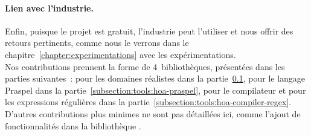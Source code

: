 \paragraph{Lien avec l'industrie.} Enfin, puisque le projet est gratuit,
l'industrie peut l'utiliser et nous offrir des retours pertinents, comme nous le
verrons dans le chapitre~\ref{chapter:experimentations} avec les
expérimentations. \\

Nos contributions prennent la forme de 4~bibliothèques, présentées dans les
parties suivantes~:  pour les domaines réalistes
dans la partie~\ref{subsection:tools:hoa-realdom}, 
pour le langage Praspel dans la partie~\ref{subsection:tools:hoa-praspel},
 pour le compilateur et
 pour les expressions régulières dans la
partie~\ref{subsection:tools:hoa-compiler-regex}. D'autres contributions plus
minimes ne sont pas détaillées ici, comme l'ajout de fonctionnalités dans la
bibliothèque .

\subsection{}
\label{subsection:tools:hoa-realdom}

